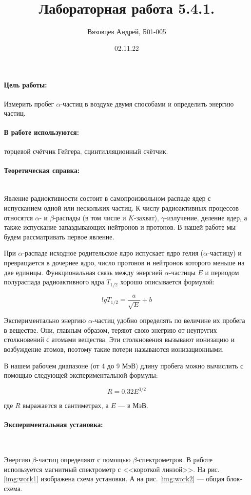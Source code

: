 \documentclass[a4paper, 12pt]{article}
\author{Вязовцев Андрей, Б01-005}
\date{02.11.22}
\title{Лабораторная работа 5.4.1.}
\newcommand{\parag}[1]{\paragraph*{#1:}}
\begin{document}
\maketitle

\parag {Цель работы} Измерить пробег $\alpha$-частиц в воздухе двумя способами и определить энергию частиц.

\parag {В работе используются} торцевой счётчик Гейгера, сцинтилляционный счётчик.

\parag {Теоретическая справка} ~\\

Явление радиоктивности состоит в самопроизвольном распаде ядер с испусканием одной или нескольких частиц. К числу радиоактивных процессов относятся $\alpha$- и $\beta$-распады (в том числе и $K$-захват), $\gamma$-излучение, деление ядер, а также испускание запаздывающих нейтронов и протонов. В нашей работе мы будем рассматривать первое явление.

При $\alpha$-распаде исходное родительское ядро испускает ядро гелия ($\alpha$-частицу) и превращается в дочернее ядро, число протонов и нейтронов которого меньше на две единицы. Функциональная связь между энергией $\alpha$-частицы $E$ и периодом полураспада радиоактивного ядра $T_{1/2}$ хорошо описывается формулой:

\begin{equation}
    lg T_{1/2} = \frac{a}{\sqrt{E}} + b
\end{equation}

Экспериментально энергию $\alpha$-частиц удобно определять по величине их пробега в веществе. Они, главным образом, теряют свою энегрию от неупругих столкновений с атомами вещества. Эти столкновения вызывают ионизацию и возбуждение атомов, поэтому такие потери называются ионизационными. 

В нашем рабочем диапазоне (от 4 до 9 МэВ) длину пробега можно вычислить с помощью следующей экспериментальной формулы:

\begin{equation}
    R = 0.32 E^{3/2}
    \label{eq:sc}
\end{equation}

где $R$ выражается в сантиметрах, а $E$ --- в МэВ.

\parag {Экспериментальная установка} ~

Энергию $\beta$-частиц определяют с помощью $\beta$-спектрометров. В работе используется магнитный спектрометр с <<короткой линзой>>. На рис. \ref{img:work1} изображена схема установки. А на рис. \ref{img:work2} --- общая блок-схема.
\end{document}
